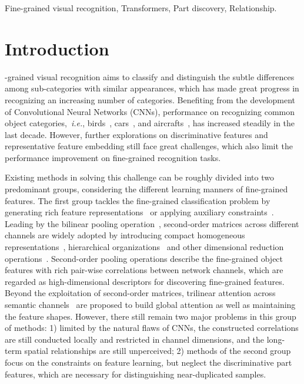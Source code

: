 \documentclass[journal]{IEEEtran}
\def\ie{{\em i.e.}}
\begin{document}
\begin{IEEEkeywords}
Fine-grained visual recognition, Transformers, Part discovery, Relationship.
\end{IEEEkeywords}

\IEEEpeerreviewmaketitle


\section{Introduction}\label{sec:intro}

-grained visual recognition aims to classify and distinguish the subtle differences among sub-categories with similar appearances, which has made great progress in recognizing an increasing number of categories. Benefiting from the development of Convolutional Neural Networks (CNNs), performance on recognizing common object categories,~\ie, birds~\cite{wah2011caltech,van2015building}, cars~\cite{krause20133d}, and aircrafts~\cite{maji2013fine}, has increased steadily in the last decade. However, further explorations on discriminative features and representative feature embedding still face great challenges, which also limit the performance improvement on fine-grained recognition tasks.

Existing methods in solving this challenge can be roughly divided into two predominant groups, considering the different learning manners of fine-grained features. The first group tackles the fine-grained classification problem by generating rich feature representations~\cite{lin2015bilinear,wang2018learning,zhang2019learning,zheng2019looking,gao2020channel} or applying auxiliary constraints~\cite{sun2018multi,dubey2018maximum}. Leading by the bilinear pooling operation~\cite{lin2015bilinear}, second-order matrices across different channels are widely adopted by introducing compact homogeneous representations~\cite{gao2016compact}, hierarchical organizations~\cite{yu2018hierarchical} and other dimensional reduction operations~\cite{kong2017low,li2017factorized,wei2018grassmann}. Second-order pooling operations describe the fine-grained object features with rich pair-wise correlations between network channels, which are regarded as high-dimensional descriptors for discovering fine-grained features.
Beyond the exploitation of second-order matrices, trilinear attention across semantic channels~\cite{zheng2019looking,gao2020channel} are proposed to build global attention as well as maintaining the feature shapes. However, there still remain two major problems in this group of methods: 1) limited by the natural flaws of CNNs, the constructed correlations are still conducted locally and restricted in channel dimensions, and the long-term spatial relationships are still unperceived; 2) methods of the second group focus on the constraints on feature learning, but neglect the discriminative part features, which are necessary for distinguishing near-duplicated samples.
\end{document}
